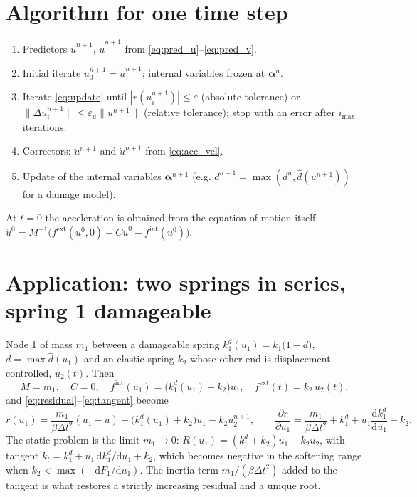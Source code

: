 \documentclass[11pt,a4paper]{article}
\begin{document}
\section{Algorithm for one time step}
\begin{enumerate}
  \item Predictors $\tilde u^{n+1}$, $\tilde{\dot u}^{n+1}$ from \eqref{eq:pred_u}--\eqref{eq:pred_v}.
  \item Initial iterate $u_0^{n+1} = \tilde u^{n+1}$; internal variables frozen at $\boldsymbol\alpha^n$.
  \item Iterate \eqref{eq:update} until $|r(u_i^{n+1})| \le \varepsilon$ (absolute tolerance) or
        $\|\Delta u_i^{n+1}\| \le \varepsilon_u\|u^{n+1}\|$ (relative tolerance); stop with an error
        after $i_{\max}$ iterations.
  \item Correctors: $\ddot u^{n+1}$ and $\dot u^{n+1}$ from \eqref{eq:acc_vel}.
  \item Update of the internal variables $\boldsymbol\alpha^{n+1}$ (e.g. $d^{n+1} = \max(d^n, \hat d(u^{n+1}))$ for a damage model).
\end{enumerate}
At $t = 0$ the acceleration is obtained from the equation of motion itself:
$\ddot u^0 = M^{-1}\bigl(f^{\text{ext}}(u^0,0) - C\dot u^0 - f^{\text{int}}(u^0)\bigr)$.

\section{Application: two springs in series, spring 1 damageable}
Node 1 of mass $m_1$ between a damageable spring $k_1^d(u_1) = k_1\bigl(1-d\bigr)$, $d = \max\hat d(u_1)$ and an
elastic spring $k_2$ whose other end is displacement controlled, $u_2(t)$. Then
\begin{equation}
  M = m_1,\quad C = 0,\quad f^{\text{int}}(u_1) = \bigl(k_1^d(u_1)+k_2\bigr)u_1,\quad
  f^{\text{ext}}(t) = k_2\,u_2(t),
\end{equation}
and \eqref{eq:residual}--\eqref{eq:tangent} become
\begin{equation}
  r(u_1) = \frac{m_1}{\beta\Delta t^2}(u_1-\tilde u) + \bigl(k_1^d(u_1)+k_2\bigr)u_1 - k_2u_2^{n+1},
  \qquad
  \frac{\partial r}{\partial u_1} = \frac{m_1}{\beta\Delta t^2} + k_1^d + u_1\frac{\mathrm dk_1^d}{\mathrm du_1} + k_2 .
\end{equation}
The static problem is the limit $m_1\to0$: $R(u_1) = (k_1^d+k_2)u_1 - k_2u_2$, with tangent
$k_t = k_1^d + u_1\,\mathrm dk_1^d/\mathrm du_1 + k_2$, which becomes negative in the softening
range when $k_2 < \max(-\mathrm dF_1/\mathrm du_1)$. The inertia term $m_1/(\beta\Delta t^2)$ added
to the tangent is what restores a strictly increasing residual and a unique root.
\end{document}
